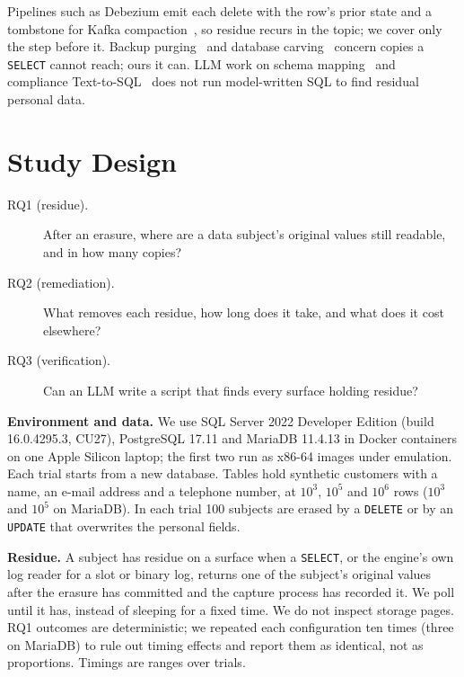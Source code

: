 \documentclass[runningheads]{llncs}
\begin{document}
Pipelines such as Debezium emit each delete with the row's prior state and a
tombstone for Kafka compaction~\cite{debezium}, so residue recurs in the topic;
we cover only the step before it. Backup
purging~\cite{lenard2024} and database carving~\cite{wagner2015} concern copies
a \texttt{SELECT} cannot reach; ours it can. LLM work on
schema mapping~\cite{fu2024} and compliance Text-to-SQL~\cite{atf2025} does not
run model-written SQL to find residual personal data.

\section{Study Design}
\label{sec:design}

\begin{description}
\item[RQ1 (residue).] After an erasure, where are a data subject's original
values still readable, and in how many copies?
\item[RQ2 (remediation).] What removes each residue, how long does it take, and
what does it cost elsewhere?
\item[RQ3 (verification).] Can an LLM write a script that finds every surface
holding residue?
\end{description}

\textbf{Environment and data.} We use SQL Server 2022 Developer Edition (build
16.0.4295.3, CU27), PostgreSQL 17.11 and MariaDB 11.4.13 in Docker containers on
one Apple Silicon laptop; the first two run as x86-64 images under emulation.
Each trial starts from a new database. Tables hold synthetic customers with a
name, an e-mail address and a telephone number, at $10^3$, $10^5$ and $10^6$
rows ($10^3$ and $10^5$ on MariaDB). In each trial 100 subjects are erased by a
\texttt{DELETE} or by an \texttt{UPDATE} that overwrites the personal fields.

\textbf{Residue.} A subject has residue on a surface when a \texttt{SELECT}, or
the engine's own log reader for a slot or binary log, returns one of the
subject's original values after the erasure has committed and the capture
process has recorded it. We poll until it has, instead of sleeping for a fixed
time. We do not inspect storage pages. RQ1 outcomes are deterministic; we repeated
each configuration ten times (three on MariaDB) to rule out timing effects and
report them as identical, not as proportions. Timings are ranges over trials.
\end{document}
